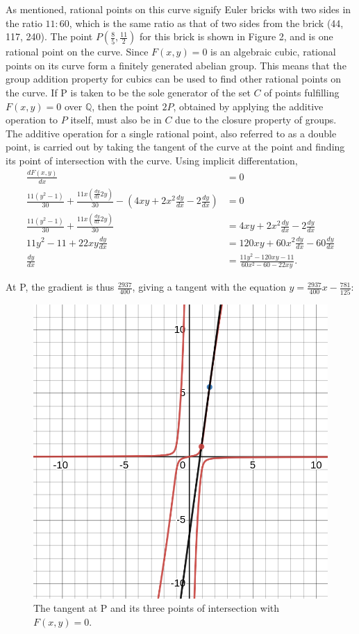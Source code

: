 \documentclass[11pt]{article}
\begin{document}
As mentioned, rational points on this curve signify Euler bricks with two sides in the ratio $11:60$, which is the same ratio as that of two sides from the brick (44, 117, 240). The point $P(\frac{8}{5},\frac{11}{2})$ for this brick is shown in Figure 2, and is one rational point on the curve. Since $F(x,y)=0$ is an algebraic cubic, rational points on its curve form a finitely generated abelian group. This means that the group addition property for cubics can be used to find other rational points on the curve. If P is taken to be the sole generator of the set $C$ of points fulfilling $F(x,y)=0$ over $\mathbb{Q}$, then the point $2P$, obtained by applying the additive operation to $P$ itself, must also be in $C$ due to the closure property of groups. The additive operation for a single rational point, also referred to as a double point, is carried out by taking the tangent of the curve at the point and finding its point of intersection with the curve. Using implicit differentation, 
\begin{equation*}
\begin{aligned}
\frac{dF(x,y)}{dx}&=0 \\
\frac{11(y^2-1)}{30}+\frac{11x(\frac{dy}{dx}2y)}{30}-(4xy+2x^2\frac{dy}{dx}-2\frac{dy}{dx})&=0 \\
\frac{11(y^2-1)}{30}+\frac{11x(\frac{dy}{dx}2y)}{30}&=4xy+2x^2\frac{dy}{dx}-2\frac{dy}{dx} \\
11y^2-11+22xy\frac{dy}{dx}&=120xy+60x^2\frac{dy}{dx}-60\frac{dy}{dx} \\
\frac{dy}{dx}&=\frac{11y^2-120xy-11}{60x^2-60-22xy}.
\end{aligned}
\end{equation*}

At P, the gradient is thus $\frac{2937}{400}$, giving a tangent with the equation $y=\frac{2937}{400}x-\frac{781}{125}$:
\begin{figure}[H]
	\centering
	\includegraphics[scale=0.25]{5.png}
	\caption{The tangent at P and its three points of intersection with $F(x,y)=0$.}
\end{figure}
\end{document}
